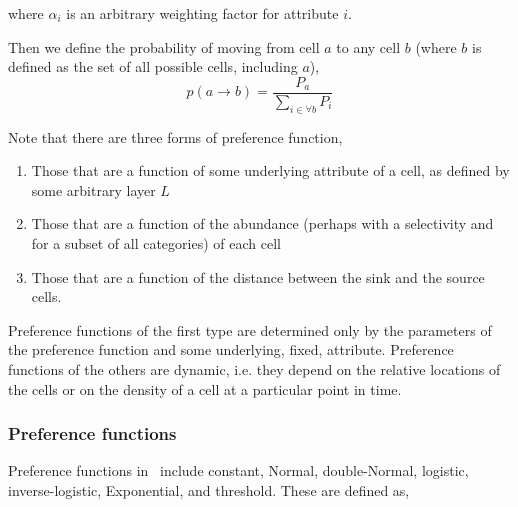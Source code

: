 where $\alpha_i$ is an arbitrary weighting factor for attribute $i$.

Then we define the probability of moving from cell $a$ to any cell $b$ (where $b$ is defined as the set of all possible cells, including $a$),
\begin{equation}
  p(a\rightarrow b) = \frac{P_a}{\sum\limits_{i \in \forall b} P_i}
\end{equation}

Note that there are three forms of preference function,
\begin{enumerate}
\item Those that are a function of some underlying attribute of a cell, as defined by some arbitrary layer $L$
\item Those that are a function of the abundance (perhaps with a selectivity and for a subset of all categories) of each cell
\item Those that are a function of the distance between the sink and the source cells. 
\end{enumerate} 

Preference functions of the first type are determined only by the parameters of the preference function and some underlying, fixed, attribute. Preference functions of the others are dynamic, i.e. they depend on the relative locations of the cells or on the density of a cell at a particular point in time.

\subsubsection*{Preference functions}

Preference functions in \SPM\ include constant, Normal, double-Normal, logistic, inverse-logistic, Exponential, and threshold. These are defined as,


